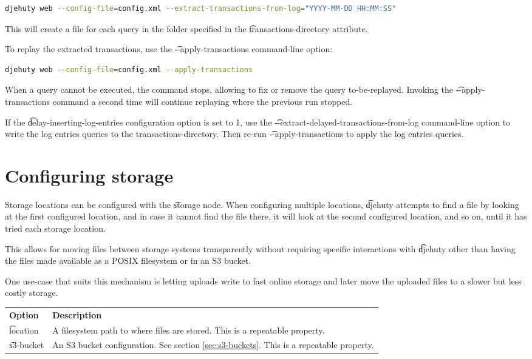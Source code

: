\begin{lstlisting}[language=bash]
djehuty web --config-file=config.xml --extract-transactions-from-log="YYYY-MM-DD HH:MM:SS"
\end{lstlisting}

  This will create a file for each query in the folder specified in the
  \t{transactions-directory} attribute.

  To replay the extracted transactions, use the \t{-{}-apply-transactions}
  command-line option:
\begin{lstlisting}[language=bash]
djehuty web --config-file=config.xml --apply-transactions
\end{lstlisting}

  When a query cannot be executed, the command stops, allowing to fix or
  remove the query to-be-replayed.  Invoking the \t{-{}-apply-transactions}
  command a second time will continue replaying where the previous run stopped.

  If the \t{delay-inserting-log-entries} configuration option is set to 1,
  use the \t{-{}-extract-delayed-transactions-from-log} command-line option to
  write the log entries queries to the transactions-directory.  Then
  re-run \t{-{}-apply-transactions} to apply the log entries queries.

\section{Configuring storage}

  Storage locations can be configured with the \t{storage} node.
  When configuring multiple locations, \t{djehuty} attempts to find a
  file by looking at the first configured location, and in case it cannot
  find the file there, it will look at the second configured location,
  and so on, until it has tried each storage location.

  This allows for moving files between storage systems transparently
  without requiring specific interactions with \t{djehuty} other than
  having the files made available as a POSIX filesystem or in an S3 bucket.

  One use-case that suits this mechanism is letting uploads write to
  fast online storage and later move the uploaded files to a slower but
  less costly storage.

\begin{tabularx}{\textwidth}{*{1}{!{\VRule[-1pt]}l}!{\VRule[-1pt]}X}
  \headrow
  \textbf{Option}            & \textbf{Description}\\
  \t{location}               & A filesystem path to where files are stored.
                               This is a repeatable property.\\
  \t{s3-bucket}              & An S3 bucket configuration. See section
                               \ref{sec:s3-buckets}. This is a repeatable
                               property.
\end{tabularx}

